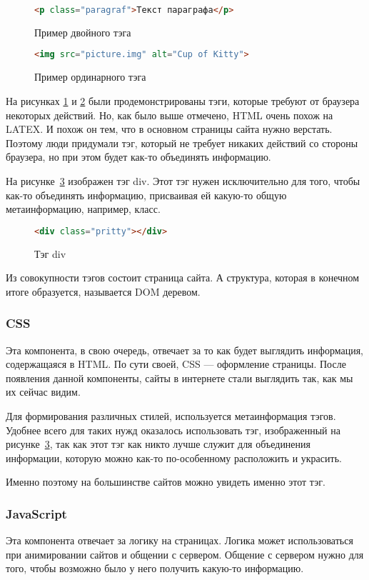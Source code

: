 \begin{figure}
    \begin{lstlisting}[language=html]
        <p class="paragraf">Текст параграфа</p>
    \end{lstlisting}
    \caption{Пример двойного тэга}
    \label{html-tag-2}
\end{figure}
\begin{figure}
    \begin{lstlisting}[language=html]
        <img src="picture.img" alt="Cup of Kitty">
    \end{lstlisting}
    \caption{Пример ординарного тэга}
    \label{html-tag-1}
\end{figure}

На рисунках \ref{html-tag-2} и \ref{html-tag-1} были продемонстрированы тэги, которые требуют от браузера некоторых действий.
Но, как было выше отмечено, HTML очень похож на LATEX. И похож он тем, что в основном страницы сайта нужно верстать. 
Поэтому люди придумали тэг, который не требует никаких действий со стороны браузера, но при этом будет как-то объединять информацию.

На рисунке~\ref{html-div} изображен тэг div. Этот тэг нужен исключительно для того, чтобы как-то объединять информацию, присваивая ей какую-то общую метаинформацию, например, класс.

\begin{figure}
	\begin{lstlisting}[language=html]
	<div class="pritty"></div>
	\end{lstlisting}
	\caption{Тэг div}
	\label{html-div}
\end{figure}

Из совокупности тэгов состоит страница сайта. А структура, которая в конечном итоге образуется, называется DOM деревом.

\subsubsection{CSS}
Эта компонента, в свою очередь, отвечает за то как будет выглядить информация, содержащаяся в HTML. По сути своей, CSS --- оформление страницы.
После появления данной компоненты, сайты в интернете стали выглядить так, как мы их сейчас видим.

Для формирования различных стилей, используется метаинформация тэгов. 
Удобнее всего для таких нужд оказалось использовать тэг, изображенный на рисунке~\ref{html-div}, так как этот тэг как никто лучше служит для объединения информации, которую можно как-то по-особенному
расположить и украсить.

Именно поэтому на большинстве сайтов можно увидеть именно этот тэг.

\subsubsection{JavaScript} \label{js-ref}
Эта компонента отвечает за логику на страницах. Логика может использоваться при анимировании сайтов и общении с сервером. Общение с сервером нужно для того, чтобы возможно было у него получить какую-то информацию.


 
